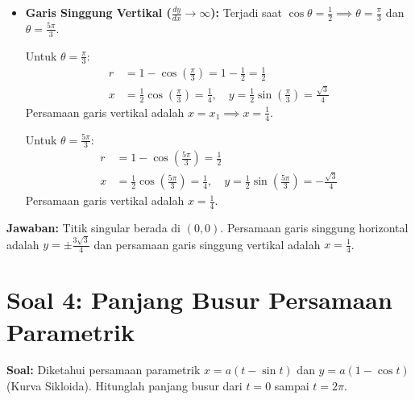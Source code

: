 \documentclass[11pt,a4paper]{article}
\begin{document}
\begin{enumerate}
\begin{itemize}
    \item \textbf{Garis Singgung Vertikal ($\frac{dy}{dx} \to \infty$):} 
    Terjadi saat $\cos\theta = \frac{1}{2} \implies \theta = \frac{\pi}{3}$ dan $\theta = \frac{5\pi}{3}$.
    
    Untuk $\theta = \frac{\pi}{3}$:
    \begin{align*}
      r &= 1 - \cos\left(\frac{\pi}{3}\right) = 1 - \frac{1}{2} = \frac{1}{2} \\
      x &= \frac{1}{2}\cos\left(\frac{\pi}{3}\right) = \frac{1}{4}, \quad y = \frac{1}{2}\sin\left(\frac{\pi}{3}\right) = \frac{\sqrt{3}}{4}
    \end{align*}
    Persamaan garis vertikal adalah $x = x_1 \implies x = \frac{1}{4}$.
    
    Untuk $\theta = \frac{5\pi}{3}$:
    \begin{align*}
      r &= 1 - \cos\left(\frac{5\pi}{3}\right) = \frac{1}{2} \\
      x &= \frac{1}{2}\cos\left(\frac{5\pi}{3}\right) = \frac{1}{4}, \quad y = \frac{1}{2}\sin\left(\frac{5\pi}{3}\right) = -\frac{\sqrt{3}}{4}
    \end{align*}
    Persamaan garis vertikal adalah $x = \frac{1}{4}$.
  \end{itemize}
\end{enumerate}
\textbf{Jawaban:} Titik singular berada di \textbf{$(0,0)$}. Persamaan garis singgung horizontal adalah \textbf{$y = \pm\frac{3\sqrt{3}}{4}$} dan persamaan garis singgung vertikal adalah \textbf{$x = \frac{1}{4}$}.

\newpage

\section*{Soal 4: Panjang Busur Persamaan Parametrik}
\textbf{Soal:} Diketahui persamaan parametrik $x = a(t - \sin t)$ dan $y = a(1 - \cos t)$ (Kurva Sikloida). Hitunglah panjang busur dari $t = 0$ sampai $t = 2\pi$.
\end{document}
